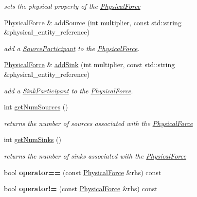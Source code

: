 \begin{DoxyCompactItemize}
\begin{DoxyCompactList}\small\item\em sets the physical property of the \hyperlink{classomexmeta_1_1PhysicalForce}{Physical\+Force} \end{DoxyCompactList}\item 
\hyperlink{classomexmeta_1_1PhysicalForce}{Physical\+Force} \& \hyperlink{classomexmeta_1_1PhysicalForce_ace7d3703d7e4bdb9a256208f456f2c4f}{add\+Source} (int multiplier, const std\+::string \&physical\+\_\+entity\+\_\+reference)
\begin{DoxyCompactList}\small\item\em add a \hyperlink{classomexmeta_1_1SourceParticipant}{Source\+Participant} to the \hyperlink{classomexmeta_1_1PhysicalForce}{Physical\+Force}. \end{DoxyCompactList}\item 
\hyperlink{classomexmeta_1_1PhysicalForce}{Physical\+Force} \& \hyperlink{classomexmeta_1_1PhysicalForce_a8ec5e262b82526ac914d8c7f10b6c2f1}{add\+Sink} (int multiplier, const std\+::string \&physical\+\_\+entity\+\_\+reference)
\begin{DoxyCompactList}\small\item\em add a \hyperlink{classomexmeta_1_1SinkParticipant}{Sink\+Participant} to the \hyperlink{classomexmeta_1_1PhysicalForce}{Physical\+Force}. \end{DoxyCompactList}\item 
int \hyperlink{classomexmeta_1_1PhysicalForce_a9910c8edac57daf70faa1f1e2e0208d1}{get\+Num\+Sources} ()
\begin{DoxyCompactList}\small\item\em returns the number of sources associated with the \hyperlink{classomexmeta_1_1PhysicalForce}{Physical\+Force} \end{DoxyCompactList}\item 
int \hyperlink{classomexmeta_1_1PhysicalForce_a1135c75705b59afa7037bab313009534}{get\+Num\+Sinks} ()
\begin{DoxyCompactList}\small\item\em returns the number of sinks associated with the \hyperlink{classomexmeta_1_1PhysicalForce}{Physical\+Force} \end{DoxyCompactList}\item 
\mbox{\label{classomexmeta_1_1PhysicalForce_affa0a1f3cdce0a3336d56658a92c65f3}} 
bool {\bfseries operator==} (const \hyperlink{classomexmeta_1_1PhysicalForce}{Physical\+Force} \&rhs) const
\item 
\mbox{\label{classomexmeta_1_1PhysicalForce_aeb7adb235c0caac04c7aa599f98f258a}} 
bool {\bfseries operator!=} (const \hyperlink{classomexmeta_1_1PhysicalForce}{Physical\+Force} \&rhs) const
\end{DoxyCompactItemize}
